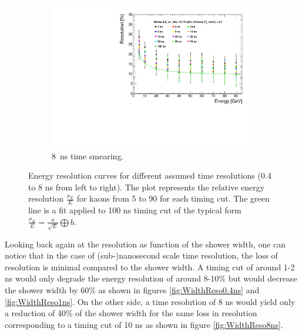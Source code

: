 \begin{figure}[htbp!]
\begin{subfigure}[t]{0.48\textwidth}
    \centering
    \includegraphics[width=1\linewidth]{../Thesis_Plots/ILD/Smearing_8ns/Plots/ShowerResoAbsolute_TimeCuts_Smearing3}
    \caption{\SI{8}{\nano\second} time smearing.}  \label{fig:Reso8ns}
  \end{subfigure}
  \caption{Energy resolution curves for different assumed time resolutions (0.4 to 8 ns from left to right). The plot represents the relative energy resolution $\frac{\sigma_{E}}{E}$ for kaons from 5 to 90 \GeV for each timing cut. The green line is a fit applied to 100 ns timing cut of the typical form $\frac{\sigma_{E}}{E} = \frac{a}{\sqrt{E}} \bigoplus b$.}
\end{figure}

Looking back again at the resolution as function of the shower width, one can notice that in the case of (sub-)nanosecond scale time resolution, the loss of resolution is minimal compared to the shower width. A timing cut of around 1-2 ns would only degrade the energy resolution of around 8-10\% but would decrease the shower width by 60\% as shown in figures \ref{fig:WidthReso0.4ns} and \ref{fig:WidthReso1ns}. On the other side, a time resolution of 8 ns would yield only a reduction of 40\% of the shower width for the same loss in resolution corresponding to a timing cut of 10 ns as shown in figure \ref{fig:WidthReso8ns}.\\

